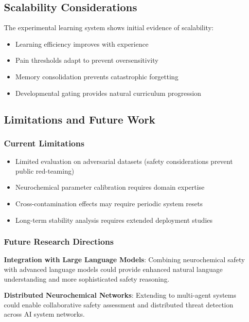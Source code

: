 \documentclass[12pt]{article}
\begin{document}
\subsection{Scalability Considerations}

The experimental learning system shows initial evidence of scalability:
\begin{itemize}
\item Learning efficiency improves with experience
\item Pain thresholds adapt to prevent oversensitivity
\item Memory consolidation prevents catastrophic forgetting
\item Developmental gating provides natural curriculum progression
\end{itemize}

\subsection{Limitations and Future Work}

\subsubsection{Current Limitations}
\begin{itemize}
\item Limited evaluation on adversarial datasets (safety considerations prevent public red-teaming)
\item Neurochemical parameter calibration requires domain expertise
\item Cross-contamination effects may require periodic system resets
\item Long-term stability analysis requires extended deployment studies
\end{itemize}

\subsubsection{Future Research Directions}

\textbf{Integration with Large Language Models}: Combining neurochemical safety with advanced language models could provide enhanced natural language understanding and more sophisticated safety reasoning.

\textbf{Distributed Neurochemical Networks}: Extending to multi-agent systems could enable collaborative safety assessment and distributed threat detection across AI system networks.
\end{document}
